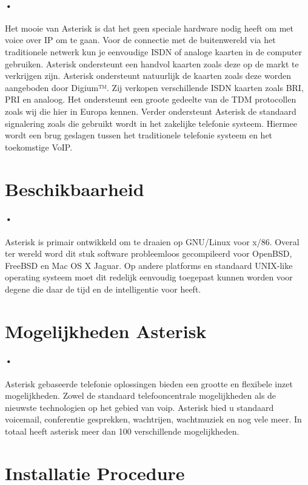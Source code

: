 \documentclass[12pt,a4paper]{report}
\begin{document}
\paragraph{•}
Het mooie van Asterisk is dat het geen speciale hardware nodig heeft om met voice over IP om te gaan. Voor de connectie met de buitenwereld via het traditionele netwerk kun je eenvoudige ISDN of analoge kaarten in de computer gebruiken. Asterisk ondersteunt een handvol kaarten zoals deze op de markt te verkrijgen zijn. Asterisk ondersteunt natuurlijk de kaarten zoals deze worden aangeboden door Digium™. Zij verkopen verschillende ISDN kaarten zoals BRI, PRI en analoog. Het ondersteunt een groote gedeelte van de TDM protocollen zoals wij die hier in Europa kennen. Verder ondersteunt Asterisk de standaard signalering zoals die gebruikt wordt in het zakelijke telefonie systeem. Hiermee wordt een brug geslagen tussen het traditionele telefonie systeem en het toekomstige VoIP.

\section{Beschikbaarheid}
\paragraph{•}
Asterisk is primair ontwikkeld om te draaien op GNU/Linux voor x/86. Overal ter wereld word dit stuk software probleemloos gecompileerd voor OpenBSD, FreeBSD en Mac OS X Jaguar. Op andere platforms en standaard UNIX-like operating systeem moet dit redelijk eenvoudig toegepast kunnen worden voor degene die daar de tijd en de intelligentie voor heeft. 

\section{Mogelijkheden Asterisk}
\paragraph{•}
Asterisk gebaseerde telefonie oplossingen bieden een grootte en flexibele inzet mogelijkheden. Zowel de standaard telefooncentrale mogelijkheden als de nieuwste technologien op het gebied van voip. Asterisk bied u standaard voicemail, conferentie gesprekken, wachtrijen, wachtmuziek en nog vele meer.  In totaal heeft asterisk meer dan 100 verschillende mogelijkheden.

\section{Installatie Procedure}
\end{document}
